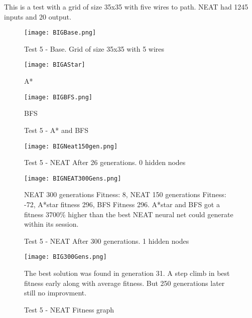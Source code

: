 \documentclass{kththesis}
\begin{document}
This is a test with a grid of size 35x35 with five wires to path. NEAT had 1245 inputs and 20 output.

\begin{figure}
\centering

\begin{minipage}{1\textwidth}
\centering
\texttt{[image: BIGBase.png]}
\end{minipage}\hfill
\caption{Test 5 - Base. Grid of size 35x35 with 5 wires}
\label{Test 5 Base}
\end{figure}

\begin{figure}
\centering

\begin{minipage}{0.45\textwidth}
\centering
\texttt{[image: BIGAStar]}
\caption{A*}
\end{minipage}\hfill
\begin{minipage}{0.45\textwidth}
\centering
\texttt{[image: BIGBFS.png]}
\caption{BFS}
\end{minipage}\hfill
\caption{Test 5 - A* and BFS}
\label{Test 5 A*}
\end{figure}

\begin{figure}
\centering
\begin{minipage}{1\textwidth}
\centering
\texttt{[image: BIGNeat150gen.png]}
\end{minipage}\hfill
\caption{Test 5 - NEAT After 26 generations. 0 hidden nodes}
\label{Test 5 26}
\end{figure}

\begin{figure}
{\centering
\begin{minipage}{1\textwidth}
\centering
\texttt{[image: BIGNEAT300Gens.png]}
\end{minipage}\hfill
\caption{Test 5 - NEAT After 300 generations. 1 hidden nodes}
\label{Test 5 300}
}
NEAT 300 generations Fitness: 8, NEAT 150 generations Fitness: -72, A*star fitness 296, BFS Fitness 296. A*star and BFS got a fitness 3700\% higher than the best NEAT neural net could generate within its session.
\end{figure}

\begin{figure}
{\centering
\begin{minipage}{1\textwidth}
\centering
\texttt{[image: BIG300Gens.png]}
\end{minipage}\hfill
\caption{Test 5 - NEAT Fitness graph}
\label{Test 5 graph}
}
The best solution was found in generation 31. A step climb in best fitness early along with average fitness. But 250 generations later still no improvment.
\end{figure}
\end{document}
